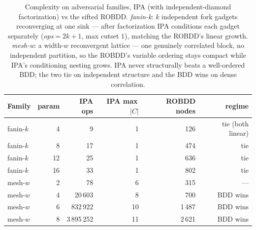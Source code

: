 
\begin{table}[t]
\centering
\caption{Complexity on adversarial families, IPA (with independent-diamond factorization) vs the sifted
ROBDD. \emph{fanin-k}: $k$ independent fork gadgets reconverging at one sink — after factorization IPA
conditions each gadget separately (\emph{ops}$=2k{+}1$, max cutset $1$), matching the ROBDD's linear
growth. \emph{mesh-w}: a width-$w$ reconvergent lattice — one genuinely correlated block, no independent
partition, so the ROBDD's variable ordering stays compact while IPA's conditioning nesting grows. IPA
never structurally beats a well-ordered BDD; the two tie on independent structure and the BDD wins on
dense correlation.}
\label{tab:adversarial}
\begin{tabular}{lrrrrr}
\hline
Family & param & IPA ops & IPA max\,$|C|$ & ROBDD nodes & regime \\
\hline
fanin-$k$ &  4 &     9 & 1 &  126 & tie (both linear) \\
fanin-$k$ &  8 &    17 & 1 &  474 & tie \\
fanin-$k$ & 12 &    25 & 1 &  636 & tie \\
fanin-$k$ & 16 &    33 & 1 &  802 & tie \\
mesh-$w$  &  2 &    78 & 6 &  315 & — \\
mesh-$w$  &  4 & 20\,603 & 8 &  700 & BDD wins \\
mesh-$w$  &  6 & 832\,922 & 10 & 1\,487 & BDD wins \\
mesh-$w$  &  8 & 3\,895\,252 & 11 & 2\,621 & BDD wins \\
\hline
\end{tabular}
\end{table}

